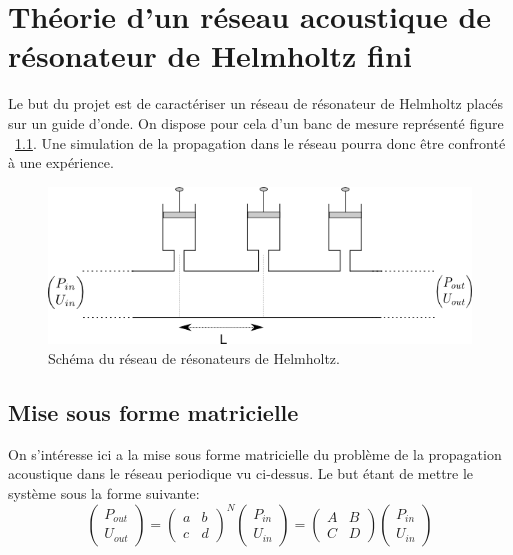 \chapter{Théorie d'un réseau acoustique de résonateur de Helmholtz fini}
Le but du projet est de caractériser un réseau de résonateur de Helmholtz placés sur un guide d'onde. On dispose pour cela d'un banc de mesure représenté figure ~\ref{schema_infini}. Une simulation de la propagation dans le réseau pourra donc être confronté à une expérience.

\begin{figure}[!ht] \centering
\includegraphics[scale=0.5]{./images_chp1/schema_reseau_infini.png}
\caption{\label{schema_infini} Schéma du réseau de résonateurs de Helmholtz.}
\end{figure}


\section{Mise sous forme matricielle}
On s’intéresse ici a la mise sous forme matricielle du problème de la propagation acoustique dans le réseau periodique vu ci-dessus. Le but étant de mettre le système sous la forme suivante:
\begin{equation}
\begin{pmatrix} P_{out} \\ U_{out} \end{pmatrix} =\begin{pmatrix} a & b \\ c & d \end{pmatrix}^N \begin{pmatrix} P_{in} \\ U_{in} \end{pmatrix} = \begin{pmatrix} A & B \\ C & D \end{pmatrix} \begin{pmatrix} P_{in} \\ U_{in} \end{pmatrix} 
\end{equation}

